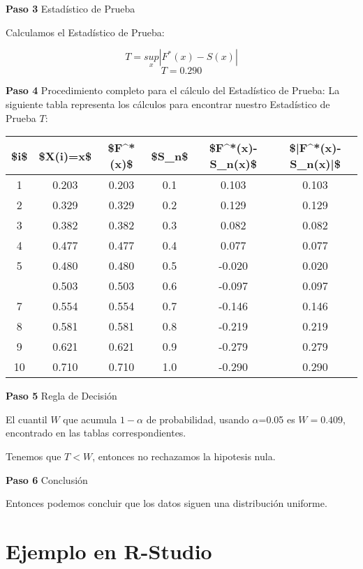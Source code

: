 \documentclass[
  a4paper,
  oneside,
  openany]{book}
\begin{document}
\textbf{Paso 3} Estadístico de Prueba

Calculamos el Estadístico de Prueba:

\[T=\underset{x}{sup}|F^*(x)-S(x)|\]
\[T=0.290\]

\textbf{Paso 4} Procedimiento completo para el cálculo del Estadístico de Prueba:
La siguiente tabla representa los cálculos para encontrar nuestro Estadístico de Prueba \(T\):

\begin{table}[H]
\centering
\begin{tabular}{cccccc}
\toprule
\$i\$ & \$X(i)=x\$ & \$F\textasciicircum{}*(x)\$ & \$S\_n\$ & \$F\textasciicircum{}*(x)-S\_n(x)\$ & \$|F\textasciicircum{}*(x)-S\_n(x)|\$\\
\midrule
1 & 0.203 & 0.203 & 0.1 & 0.103 & 0.103\\
2 & 0.329 & 0.329 & 0.2 & 0.129 & 0.129\\
3 & 0.382 & 0.382 & 0.3 & 0.082 & 0.082\\
4 & 0.477 & 0.477 & 0.4 & 0.077 & 0.077\\
5 & 0.480 & 0.480 & 0.5 & -0.020 & 0.020\\
\addlinespace
6 & 0.503 & 0.503 & 0.6 & -0.097 & 0.097\\
7 & 0.554 & 0.554 & 0.7 & -0.146 & 0.146\\
8 & 0.581 & 0.581 & 0.8 & -0.219 & 0.219\\
9 & 0.621 & 0.621 & 0.9 & -0.279 & 0.279\\
10 & 0.710 & 0.710 & 1.0 & -0.290 & 0.290\\
\bottomrule
\end{tabular}
\end{table}

\textbf{Paso 5} Regla de Decisión

El cuantil \(W\) que acumula \(1-\alpha\) de probabilidad, usando \(\alpha\)=0.05 es \(W=0.409\), encontrado en las tablas correspondientes.

Tenemos que \(T<W\), entonces no rechazamos la hipotesis nula.

\textbf{Paso 6} Conclusión

Entonces podemos concluir que los datos siguen una distribución uniforme.

\hypertarget{ejemplo-en-r-studio-14}{%
\section{Ejemplo en R-Studio}\label{ejemplo-en-r-studio-14}}
\end{document}
